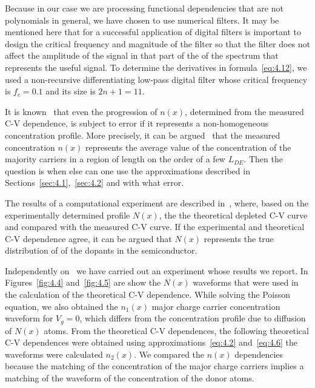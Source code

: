 \par Because in our case we are processing functional dependencies
that are not polynomials in general, we have chosen to use numerical
filters. It may be mentioned here that for a successful application of
digital filters is important to design the critical frequency and
magnitude of the filter so that the filter does not affect the
amplitude of the signal in that part of the of the spectrum that
represents the useful signal. To determine the derivatives in
formula~\ref{eq:4.12}, we used a non-recursive differentiating
low-pass digital filter whose critical frequency is $f_{c}=0.1$ and
its size is $2n+1=11$.

\par It is known~\cite{4.18} that even the progression of $n(x)$,
determined from the measured C-V dependence, is subject to error if it
represents a non-homogeneous concentration profile. More precisely, it
can be argued~\cite{4.3} that the measured concentration $n(x)$
represents the average value of the concentration of the majority
carriers in a region of length on the order of a few $L_{DE}$. Then
the question is when else can one use the approximations described in
Sections~\ref{sec:4.1},~\ref{sec:4.2} and with what error.

\par The results of a computational experiment are described
in~\cite{4.22}, where, based on the experimentally determined profile
$N(x)$, the the theoretical depleted C-V curve and compared with the
measured C-V curve. If the experimental and theoretical C-V dependence
agree, it can be argued that $N(x)$ represents the true distribution
of of the dopants in the semiconductor.

\par Independently on~\cite{4.22} we have carried out an experiment
whose results we report. In Figures~\ref{fig:4.4} and~\ref{fig:4.5}
are show the $N(x)$ waveforms that were used in the calculation of the
theoretical C-V dependence. While solving the Poisson equation, we
also obtained the $n_{1}(x)$ major charge carrier concentration
waveform for $V_{g}=0$, which differs from the concentration profile
due to diffusion of $N(x)$ atoms. From the theoretical C-V
dependences, the following theoretical C-V dependences were obtained
using approximations~\ref{eq:4.2} and~\ref{eq:4.6} the waveforms were
calculated $n_{2}(x)$.  We compared the $n(x)$ dependencies because
the matching of the concentration of the major charge carriers implies
a matching of the waveform of the concentration of the donor atoms.

